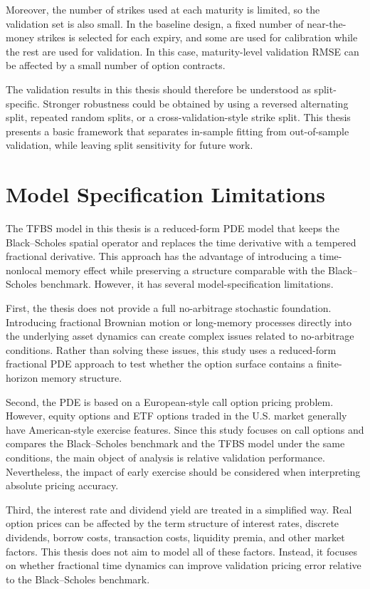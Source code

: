 \documentclass[11pt,a4paper]{report}
\begin{document}
Moreover, the number of strikes used at each maturity is limited, so the validation set is also small. In the baseline design, a fixed number of near-the-money strikes is selected for each expiry, and some are used for calibration while the rest are used for validation. In this case, maturity-level validation RMSE can be affected by a small number of option contracts.

The validation results in this thesis should therefore be understood as split-specific. Stronger robustness could be obtained by using a reversed alternating split, repeated random splits, or a cross-validation-style strike split. This thesis presents a basic framework that separates in-sample fitting from out-of-sample validation, while leaving split sensitivity for future work.

\section{Model Specification Limitations}

The TFBS model in this thesis is a reduced-form PDE model that keeps the Black--Scholes spatial operator and replaces the time derivative with a tempered fractional derivative. This approach has the advantage of introducing a time-nonlocal memory effect while preserving a structure comparable with the Black--Scholes benchmark. However, it has several model-specification limitations.

First, the thesis does not provide a full no-arbitrage stochastic foundation. Introducing fractional Brownian motion or long-memory processes directly into the underlying asset dynamics can create complex issues related to no-arbitrage conditions. Rather than solving these issues, this study uses a reduced-form fractional PDE approach to test whether the option surface contains a finite-horizon memory structure.

Second, the PDE is based on a European-style call option pricing problem. However, equity options and ETF options traded in the U.S. market generally have American-style exercise features. Since this study focuses on call options and compares the Black--Scholes benchmark and the TFBS model under the same conditions, the main object of analysis is relative validation performance. Nevertheless, the impact of early exercise should be considered when interpreting absolute pricing accuracy.

Third, the interest rate and dividend yield are treated in a simplified way. Real option prices can be affected by the term structure of interest rates, discrete dividends, borrow costs, transaction costs, liquidity premia, and other market factors. This thesis does not aim to model all of these factors. Instead, it focuses on whether fractional time dynamics can improve validation pricing error relative to the Black--Scholes benchmark.
\end{document}
